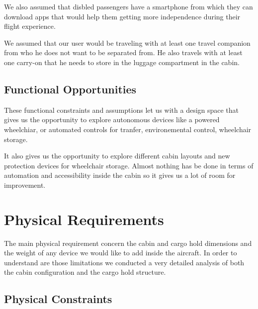 We also assumed that disbled passengers have a smartphone from which they can download apps that would help them getting more independence during their flight experience.

We assumed that our user would be traveling with at least one travel companion from who he does not want to be separated from. He also travels with at least one carry-on that he needs to store in the luggage compartment in the cabin.

\subsection{Functional Opportunities}

These functional constraints and assumptions let us with a design space that gives us the opportunity to explore autonomous devices like a powered wheelchiar, or automated controls for tranfer, environemental control, wheelchair storage.

It also gives us the opportunity to explore different cabin layouts and new protection devices for wheelchair storage. Almost nothing has be done in terms of automation and accessibility inside the cabin so it gives us a lot of room for improvement.

\section{Physical Requirements}

The main physical requirement concern the cabin and cargo hold dimensions and the weight of any device we would like to add inside the aircraft. In order to understand are those limitations we conducted a very detailed analysis of both the cabin configuration and the cargo hold structure.

\subsection{Physical Constraints}

